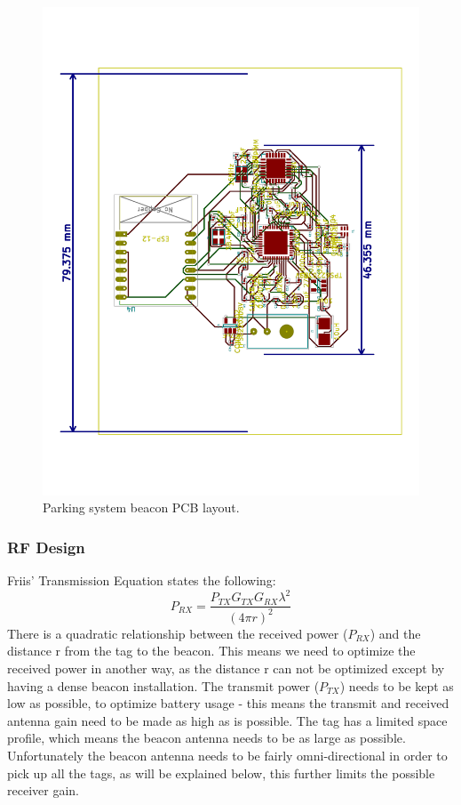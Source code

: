 \begin{figure}[H]
\begin{center}
\includegraphics[scale=0.4,trim={1cm 1cm 1cm 1cm},clip,angle=-90]{data/pcb-layout-ESP.pdf}
\caption{Parking system beacon PCB layout.}
\end{center}
\end{figure}

\subsubsection{RF Design}

Friis' Transmission Equation states the following:
$$P_{RX} = \frac{P_{TX}G_{TX}G_{RX} \lambda^2}{(4 \pi r)^2}$$
There is a quadratic relationship between the received power ($P_{RX}$) and the distance r from the tag to the beacon. This means we need to optimize the received power in another way, as the distance r can not be optimized except by having a dense beacon installation. The transmit power ($P_{TX}$) needs to be kept as low as possible, to optimize battery usage - this means the transmit and received antenna gain need to be made as high as is possible. The tag has a limited space profile, which means the beacon antenna needs to be as large as possible. Unfortunately the beacon antenna needs to be fairly omni-directional in order to pick up all the tags, as will be explained below, this further limits the possible receiver gain.

